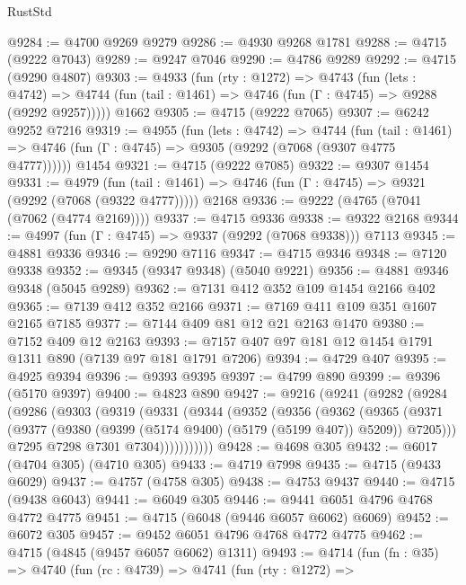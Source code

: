 \begin{lexlean}{RustStd}
\begin{coremodule}
@9284 := @4700 @9269 @9279
@9286 := @4930 @9268 @1781
@9288 := @4715 (@9222 @7043)
@9289 := @9247 @7046
@9290 := @4786 @9289
@9292 := @4715 (@9290 @4807)
@9303 := @4933
    (fun (rty : @1272) =>
    @4743
      (fun (lets : @4742) =>
      @4744 (fun (tail : @1461) => @4746 (fun (Γ : @4745) => @9288 (@9292 @9257)))))
    @1662
@9305 := @4715 (@9222 @7065)
@9307 := @6242 @9252 @7216
@9319 := @4955
    (fun (lets : @4742) =>
    @4744
      (fun (tail : @1461) => @4746 (fun (Γ : @4745) => @9305 (@9292 (@7068 (@9307 @4775 @4777))))))
    @1454
@9321 := @4715 (@9222 @7085)
@9322 := @9307 @1454
@9331 := @4979
    (fun (tail : @1461) => @4746 (fun (Γ : @4745) => @9321 (@9292 (@7068 (@9322 @4777)))))
    @2168
@9336 := @9222 (@4765 (@7041 (@7062 (@4774 @2169))))
@9337 := @4715 @9336
@9338 := @9322 @2168
@9344 := @4997 (fun (Γ : @4745) => @9337 (@9292 (@7068 @9338))) @7113
@9345 := @4881 @9336
@9346 := @9290 @7116
@9347 := @4715 @9346
@9348 := @7120 @9338
@9352 := @9345 (@9347 @9348) (@5040 @9221)
@9356 := @4881 @9346 @9348 (@5045 @9289)
@9362 := @7131 @412 @352 @109 @1454 @2166 @402
@9365 := @7139 @412 @352 @2166
@9371 := @7169 @411 @109 @351 @1607 @2165 @7185
@9377 := @7144 @409 @81 @12 @21 @2163 @1470
@9380 := @7152 @409 @12 @2163
@9393 := @7157 @407 @97 @181 @12 @1454 @1791 @1311 @890 (@7139 @97 @181 @1791 @7206)
@9394 := @4729 @407
@9395 := @4925 @9394
@9396 := @9393 @9395
@9397 := @4799 @890
@9399 := @9396 (@5170 @9397)
@9400 := @4823 @890
@9427 := @9216
    (@9241
      (@9282
        (@9284
          (@9286
            (@9303
              (@9319
                (@9331
                  (@9344
                    (@9352
                      (@9356
                        (@9362
                          (@9365
                            (@9371
                              (@9377
                                (@9380 (@9399 (@5174 @9400) (@5179 (@5199 @407)) @5209))
                                @7205)))
                          @7295
                          @7298
                          @7301
                          @7304)))))))))))
@9428 := @4698 @305
@9432 := @6017 (@4704 @305) (@4710 @305)
@9433 := @4719 @7998
@9435 := @4715 (@9433 @6029)
@9437 := @4757 (@4758 @305)
@9438 := @4753 @9437
@9440 := @4715 (@9438 @6043)
@9441 := @6049 @305
@9446 := @9441 @6051 @4796 @4768 @4772 @4775
@9451 := @4715 (@6048 (@9446 @6057 @6062) @6069)
@9452 := @6072 @305
@9457 := @9452 @6051 @4796 @4768 @4772 @4775
@9462 := @4715 (@4845 (@9457 @6057 @6062) @1311)
@9493 := @4714
    (fun (fn : @35) =>
    @4740
      (fun (rc : @4739) =>
      @4741
        (fun (rty : @1272) =>

\end{coremodule}
\end{lexlean}
